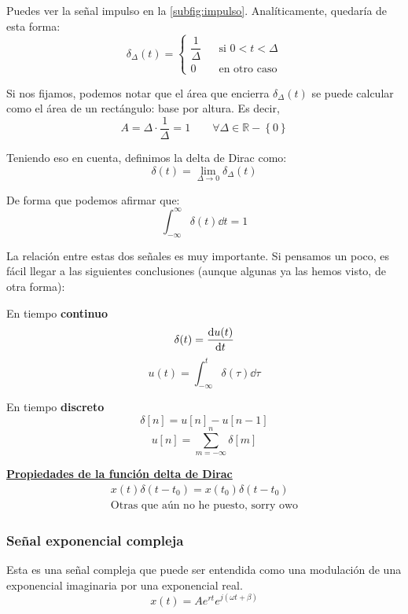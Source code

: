 \documentclass[a4paper]{book}
\begin{document}
Puedes ver la señal impulso en la \autoref{subfig:impulso}. Analíticamente, quedaría de esta forma: \[\delta _{\Delta}(t) = \left\{ \begin{matrix}
\dfrac{1}{\Delta} &  & \text{si }0<t<\Delta \\[12pt]
0                 &  & \text{en otro caso}
\end{matrix} \right.\]

Si nos fijamos, podemos notar que el área que encierra $\delta _\Delta (t)$ se puede calcular como el área de un rectángulo: base por altura. Es decir, \[A= \Delta\cdot \frac{1}{\Delta} = 1 \qquad \forall \Delta \in \mathbb{R} -\left\{ 0 \right\} \]

Teniendo eso en cuenta, definimos la delta de Dirac como: \[\delta (t) = \lim_{\Delta \to 0}{\delta _{\Delta} (t)}\]

De forma que podemos afirmar que:
\[\int_{-\infty}^\infty{\delta (t)\dd t} = 1\]


\begin{nota}
	\label{relacion_delta_escalon}
	La relación entre estas dos señales es muy importante. Si pensamos un poco, es fácil llegar a las siguientes conclusiones (aunque algunas ya las hemos visto, de otra forma):
	\begin{multicols}{2}
		\centering
		En tiempo \textbf{continuo}
		\[\delta (t) = \dv{u(t)}{t} \]
		\[u(t) = \int_{-\infty}^{t}{\delta (\tau ) \dd \tau }\]

		En tiempo \textbf{discreto}
		\[\delta [n] = u[n] - u[n-1]\]
		\[u[n] = \sum^{n}_{m=-\infty}{\delta [m]}\]
	\end{multicols}
\end{nota}

\begin{center}
	\underline{\textbf{Propiedades de la función delta de Dirac}}
	\begin{align*}
		x(t)\delta (t-t_0) = x(t_0)\delta(t-t_0) \\
		\text{Otras que aún no he puesto, sorry owo}
	\end{align*}
\end{center}

\subsubsection{Señal exponencial compleja}
Esta es una señal compleja que puede ser entendida como una modulación de una exponencial imaginaria por una exponencial real. \[x(t) = Ae^{rt}e^{j\left( \omega t + \beta \right)}\]
\end{document}
